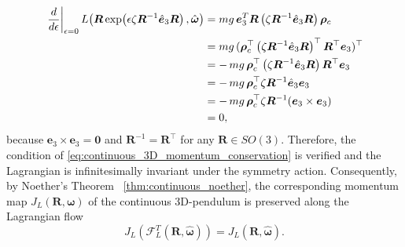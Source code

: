 \begin{align} \label{eq:continuous_3d_pendulum_validation}
\left.\frac{d}{d\epsilon}\right|_{\epsilon=0}
L\!\left(\bm{R}\exp\!\left(\epsilon \zeta \bm{R}^{-1}\hat{\bm{e}}_3\bm{R}\right),\hat{\bm{\omega}}\right)
&=
mg\,\bm{e}_3^T\bm{R}
\left(\zeta \bm{R}^{-1}\hat{\bm{e}}_3\bm{R}\right)
\bm{\rho}_c \notag\\
&=
mg\,(\bm{\rho}_c^\top
\left(\zeta \bm{R}^{-1}\hat{\bm{e}}_3\bm{R}\right)^\top
\bm{R}^\top\bm{e}_3)^\top \notag\\
&=
-\,mg\,\bm{\rho}_c^\top
\left(\zeta \bm{R}^{-1}\hat{\bm{e}}_3\bm{R}\right)
\bm{R}^\top\bm{e}_3 \notag\\
&=
-\,mg\,\bm{\rho}_c^\top
\zeta \bm{R}^{-1}\hat{\bm{e}}_3\bm{e}_3 \notag\\
&=
-\,mg\,\bm{\rho}_c^\top
\zeta \bm{R}^{-1}(\bm{e}_3\times \bm{e}_3) \notag\\
&=0,
\end{align}
because $\bm{e}_3\times \bm{e}_3=\bm{0}$ and $\bm{R}^{-1}=\bm{R}^{\top}$ for any $\bm{R} \in SO(3)$. Therefore, the condition of \eqref{eq:continuous_3D_momentum_conservation} is verified and the Lagrangian is infinitesimally invariant under the symmetry action. Consequently, by Noether's Theorem ~\ref{thm:continuous_noether}, 
the corresponding momentum map $J_L(\bm{R},\bm{\omega})$ of the continuous 3D-pendulum is preserved along the Lagrangian flow
\[  J_L\!\left(\mathcal{F}_L^T(\bm{R},\hat{\bm{\omega}})\right)
    =
    J_L(\bm{R},\hat{\bm{\omega}}).
\]
